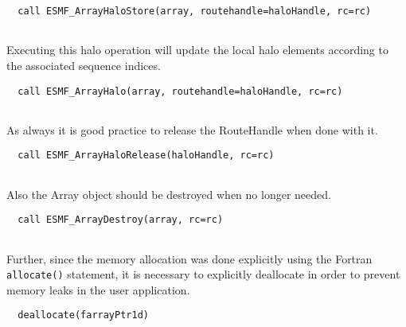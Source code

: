 
 \begin{verbatim}
  call ESMF_ArrayHaloStore(array, routehandle=haloHandle, rc=rc)
 
\end{verbatim}
 

   Executing this halo operation will update the local halo elements according
   to the associated sequence indices. 

 \begin{verbatim}
  call ESMF_ArrayHalo(array, routehandle=haloHandle, rc=rc)
 
\end{verbatim}
 

   As always it is good practice to release the RouteHandle when done with it. 

 \begin{verbatim}
  call ESMF_ArrayHaloRelease(haloHandle, rc=rc)
 
\end{verbatim}
 

   Also the Array object should be destroyed when no longer needed. 

 \begin{verbatim}
  call ESMF_ArrayDestroy(array, rc=rc)
 
\end{verbatim}
 

   Further, since the memory allocation was done explicitly using the Fortran
   {\tt allocate()} statement, it is necessary to explicitly deallocate in order
   to prevent memory leaks in the user application. 

 \begin{verbatim}
  deallocate(farrayPtr1d)
 
\end{verbatim}
 
